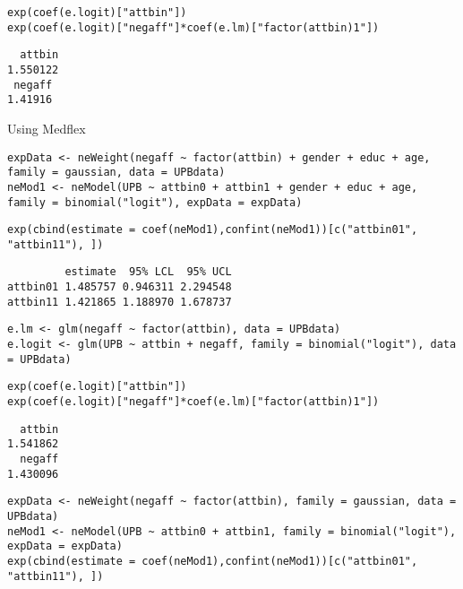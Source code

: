 \documentclass[12pt]{article}
\begin{document}
\lstset{language=r,label= ,caption= ,captionpos=b,numbers=none}
\begin{lstlisting}
exp(coef(e.logit)["attbin"])
exp(coef(e.logit)["negaff"]*coef(e.lm)["factor(attbin)1"])
\end{lstlisting}

\begin{verbatim}
  attbin 
1.550122
 negaff 
1.41916
\end{verbatim}


Using Medflex
\lstset{language=r,label= ,caption= ,captionpos=b,numbers=none}
\begin{lstlisting}
expData <- neWeight(negaff ~ factor(attbin) + gender + educ + age, family = gaussian, data = UPBdata)
neMod1 <- neModel(UPB ~ attbin0 + attbin1 + gender + educ + age, family = binomial("logit"), expData = expData)
\end{lstlisting}

\lstset{language=r,label= ,caption= ,captionpos=b,numbers=none}
\begin{lstlisting}
exp(cbind(estimate = coef(neMod1),confint(neMod1))[c("attbin01", "attbin11"), ])
\end{lstlisting}
\begin{verbatim}
         estimate  95% LCL  95% UCL
attbin01 1.485757 0.946311 2.294548
attbin11 1.421865 1.188970 1.678737
\end{verbatim}


\lstset{language=r,label= ,caption= ,captionpos=b,numbers=none}
\begin{lstlisting}
e.lm <- glm(negaff ~ factor(attbin), data = UPBdata)
e.logit <- glm(UPB ~ attbin + negaff, family = binomial("logit"), data = UPBdata)
\end{lstlisting}

\lstset{language=r,label= ,caption= ,captionpos=b,numbers=none}
\begin{lstlisting}
exp(coef(e.logit)["attbin"])
exp(coef(e.logit)["negaff"]*coef(e.lm)["factor(attbin)1"])
\end{lstlisting}

\begin{verbatim}
  attbin 
1.541862
  negaff 
1.430096
\end{verbatim}


\lstset{language=r,label= ,caption= ,captionpos=b,numbers=none}
\begin{lstlisting}
expData <- neWeight(negaff ~ factor(attbin), family = gaussian, data = UPBdata)
neMod1 <- neModel(UPB ~ attbin0 + attbin1, family = binomial("logit"), expData = expData)
exp(cbind(estimate = coef(neMod1),confint(neMod1))[c("attbin01", "attbin11"), ])
\end{lstlisting}
\end{document}
